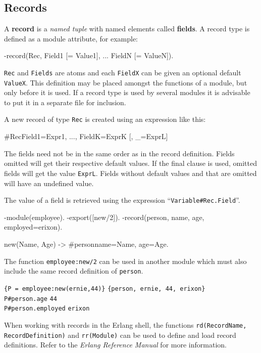 \subsection{Records}
\label{datatypes:record}
A \textbf{record} is a \textit{named tuple} with named elements
called \textbf{fields}.  A record type is defined as a module attribute, for example:

\begin{erlang}
-record(Rec, {Field1 [= Value1],
              ...
              FieldN [= ValueN]}).
\end{erlang}

\texttt{Rec} and \texttt{Fields} are atoms and each \texttt{FieldX}
can be given an optional default \texttt{ValueX}. This definition may
be placed amongst the functions of a module, but only before it is used.  If a record type is
used by several modules it is advisable to put it in a separate file for inclusion.

A new record of type \texttt{Rec} is created using an expression like this:

\begin{erlang}
#Rec{Field1=Expr1, ..., FieldK=ExprK [, _=ExprL]}
\end{erlang}

The fields need not be in the same order as in the record
definition. Fields omitted will get their respective default
values. If the final clause is used, omitted fields will get the value
\texttt{ExprL}. Fields without default values and that are omitted
will have an undefined value.

The value of a field is retrieved using the expression
``\texttt{Variable\#Rec.Field}''.

\begin{erlang}
-module(employee).
-export([new/2]).
-record(person, {name, age, employed=erixon}).

new(Name, Age) -> #person{name=Name, age=Age}.
\end{erlang}

The function \texttt{employee:new/2} can be used in another module
which must also include the same record definition of \texttt{person}.

\texttt{\{P = employee:new(ernie,44)\}} \resultingin \texttt{\{person, ernie, 44,
erixon\}} \\
\texttt{P\#person.age} \resultingin \texttt{44} \\
\texttt{P\#person.employed} \resultingin \texttt{erixon}

When working with records in the Erlang shell, the functions \texttt{rd(RecordName, RecordDefinition)} and \texttt{rr(Module)} can be used to
define and load record definitions.  Refer to the \textit{Erlang Reference Manual} for more information.


